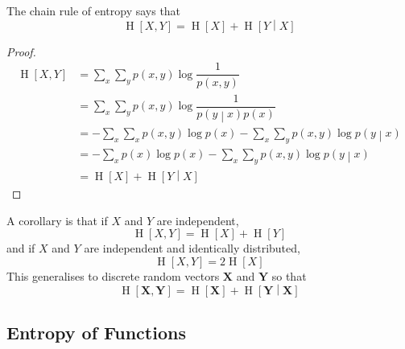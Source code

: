 \documentclass[11pt]{report} %
\begin{document}
The chain rule of entropy says that
\begin{equation}
\operatorname{H}\left[X, Y\right] = \operatorname{H}\left[X\right]+ \operatorname{H}\left[Y\middle|X\right]
\end{equation}
\begin{proof}
\begin{align}
\operatorname{H}\left[X, Y\right] &= \sum_{x}\sum_{y}p\left(x, y\right)\log\dfrac{1}{p\left(x, y\right)} \\
&= \sum_{x}\sum_{y}p\left(x, y\right)\log\dfrac{1}{p\left(y\middle|x\right)p\left(x\right)} \\
&= -\sum_{x}\sum_{x}p\left(x, y\right)\log p\left(x\right) -\sum_{x}\sum_{y}p\left(x, y\right)\log p\left(y\middle|x\right) \\
&= -\sum_{x}p\left(x\right)\log p\left(x\right) -\sum_{x}\sum_{y}p\left(x, y\right)\log p\left(y\middle|x\right) \\
&= \operatorname{H}\left[X\right]+ \operatorname{H}\left[Y\middle|X\right]
\end{align}
\end{proof}
A corollary is that if $X$ and $Y$ are independent,
\begin{equation}
\operatorname{H}\left[X, Y\right] = \operatorname{H}\left[X\right]+ \operatorname{H}\left[Y\right]
\end{equation}
and if $X$ and $Y$ are independent and identically distributed,
\begin{equation}
\operatorname{H}\left[X, Y\right] = 2\operatorname{H}\left[X\right]
\end{equation}
This generalises to discrete random vectors $\mathbf{X}$ and $\mathbf{Y}$ so that
\begin{equation}
\operatorname{H}\left[\mathbf{X}, \mathbf{Y}\right] = \operatorname{H}\left[\mathbf{X}\right]+ \operatorname{H}\left[\mathbf{Y}\middle|\mathbf{X}\right]
\end{equation}

\subsection{Entropy of Functions}
\end{document}
